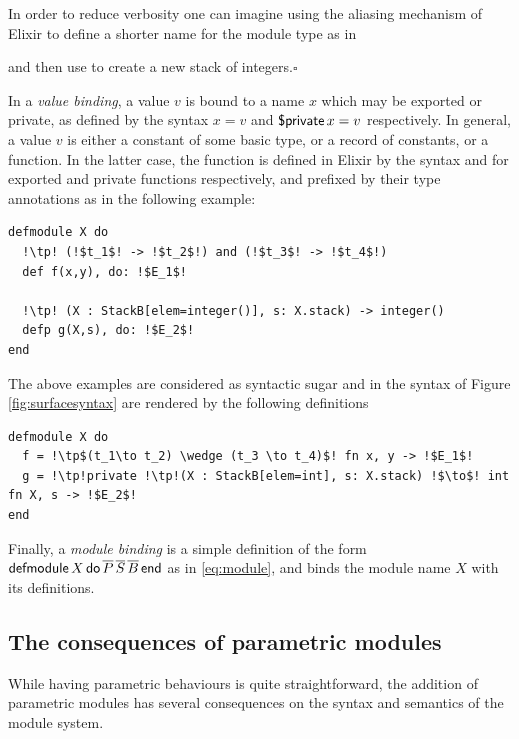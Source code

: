 \documentclass[a4paper,10pt]{article}
\begin{document}
\begin{remark} In order to reduce verbosity one can imagine using the aliasing mechanism of Elixir to define a shorter name for the module type  as in


\noindent
and then use  to create a new stack of integers.\hfill$\square$
\end{remark}

In a \emph{value binding}, a value $v$ is bound to a name $x$ which may be exported or private, as defined by the syntax $x = v$ and $\operatorname{\textsf{\$private}} x = v$ respectively. In general, a value $v$ is either a constant of some basic type, or a record of constants, or a function. In the latter case, the function is defined in Elixir by the syntax  and  for exported and private functions respectively, and prefixed by their type annotations as in the following example:
\begin{verbatim}
defmodule X do
  !\tp! (!$t_1$! -> !$t_2$!) and (!$t_3$! -> !$t_4$!)
  def f(x,y), do: !$E_1$! 

  !\tp! (X : StackB[elem=integer()], s: X.stack) -> integer()
  defp g(X,s), do: !$E_2$!
end  
\end{verbatim}
The above examples are considered as syntactic sugar and in the syntax of Figure \ref{fig:surfacesyntax} are rendered by the following definitions 
\begin{verbatim}
defmodule X do
  f = !\tp$(t_1\to t_2) \wedge (t_3 \to t_4)$! fn x, y -> !$E_1$!
  g = !\tp!private !\tp!(X : StackB[elem=int], s: X.stack) !$\to$! int fn X, s -> !$E_2$!
end
\end{verbatim}

Finally, a \emph{module binding} is a simple definition of the form $\operatorname{\textsf{defmodule}} X \operatorname{\textsf{do}} \overline{P}\, \overline{S}\, \overline{B} \operatorname{\textsf{end}}$  as in \eqref{eq:module}, and binds the module name $X$ with its definitions.


\subsection{The consequences of parametric modules}
While having parametric behaviours is quite straightforward, the addition of parametric modules has several consequences on the syntax and semantics of the module system.
\end{document}
